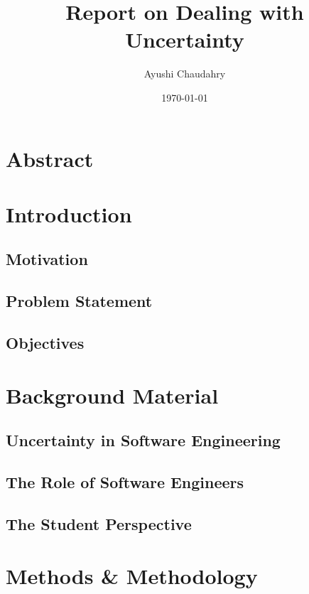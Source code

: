 \documentclass[a4paper,12pt]{report}
\begin{document}
\title{Report on Dealing with Uncertainty}
\author{Ayushi Chaudahry}
\date{\today}

\maketitle

\tableofcontents

\chapter{Abstract}

\chapter{Introduction}
\section{Motivation}
\section{Problem Statement}
\section{Objectives}

\chapter{Background Material}
\section{Uncertainty in Software Engineering}
\section{The Role of Software Engineers}
\section{The Student Perspective}

\chapter{Methods \& Methodology}
\end{document}
